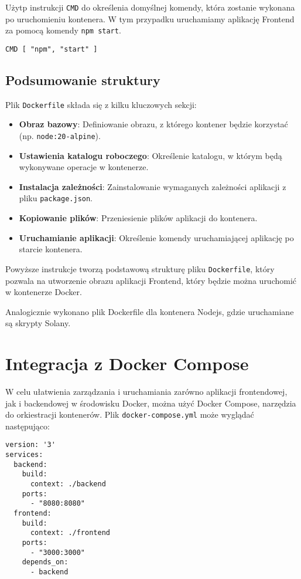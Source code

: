 Użytp instrukcji \texttt{CMD} do określenia domyślnej komendy, która zostanie wykonana po uruchomieniu kontenera. W tym przypadku uruchamiamy aplikację Frontend za pomocą komendy \texttt{npm start}.

\begin{verbatim}
CMD [ "npm", "start" ]
\end{verbatim}

\subsection{Podsumowanie struktury}

Plik \texttt{Dockerfile} składa się z kilku kluczowych sekcji:
\begin{itemize}
    \item \textbf{Obraz bazowy}: Definiowanie obrazu, z którego kontener będzie korzystać (np. \texttt{node:20-alpine}).
    \item \textbf{Ustawienia katalogu roboczego}: Określenie katalogu, w którym będą wykonywane operacje w kontenerze.
    \item \textbf{Instalacja zależności}: Zainstalowanie wymaganych zależności aplikacji z pliku \texttt{package.json}.
    \item \textbf{Kopiowanie plików}: Przeniesienie plików aplikacji do kontenera.
    \item \textbf{Uruchamianie aplikacji}: Określenie komendy uruchamiającej aplikację po starcie kontenera.
\end{itemize}

Powyższe instrukcje tworzą podstawową strukturę pliku \texttt{Dockerfile}, który pozwala na utworzenie obrazu aplikacji Frontend, który będzie można uruchomić w kontenerze Docker.

Analogicznie wykonano plik Dockerfile dla kontenera Nodejs, gdzie uruchamiane są skrypty Solany.

\section{Integracja z Docker Compose}

W celu ułatwienia zarządzania i uruchamiania zarówno aplikacji frontendowej, jak i backendowej w środowisku Docker, można użyć Docker Compose, narzędzia do orkiestracji kontenerów. Plik \texttt{docker-compose.yml} może wyglądać następująco:

\begin{verbatim}
version: '3'
services:
  backend:
    build:
      context: ./backend
    ports:
      - "8080:8080"
  frontend:
    build:
      context: ./frontend
    ports:
      - "3000:3000"
    depends_on:
      - backend
\end{verbatim}


